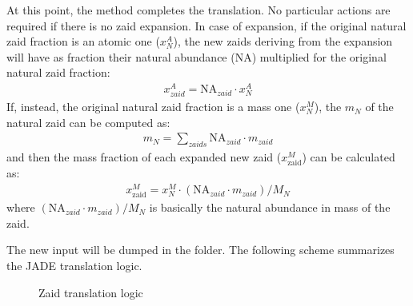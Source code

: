 \documentclass[letterpaper,10pt,english]{sphinxmanual}
\let\sphinxpxdimen\pdfpxdimen\else\newdimen\sphinxpxdimen
\begin{document}
\sphinxAtStartPar
At this point, the  method completes the translation. No particular actions
are required if there is no zaid expansion.
In case of expansion, if the original natural zaid fraction is an atomic one
(\(x^A_N\)), the new zaids deriving from the expansion will have as fraction their
natural abundance (NA) multiplied for the original natural zaid fraction:
\begin{equation*}
\begin{split}x^A_{zaid} = \text{NA}_{zaid}\cdot x^A_N\end{split}
\end{equation*}
\sphinxAtStartPar
If, instead, the original natural zaid fraction is a mass one (\(x^M_N\)),
the  \(m_N\) of the natural zaid can be computed as:
\begin{equation*}
\begin{split}m_N = \sum_{zaids} \text{NA}_{zaid}\cdot m_{zaid}\end{split}
\end{equation*}
\sphinxAtStartPar
and then the mass fraction of each expanded new zaid (\(x^M_\text{zaid}\))
can be calculated as:
\begin{equation*}
\begin{split}x^M_\text{zaid}=x^M_N\cdot (\text{NA}_{zaid}\cdot m_{zaid})/M_N\end{split}
\end{equation*}
\sphinxAtStartPar
where \((\text{NA}_{zaid}\cdot m_{zaid})/M_N\)
is basically the natural abundance in mass of the zaid.

\sphinxAtStartPar
The new input will be dumped in the
 folder.
The following scheme summarizes the JADE translation logic.

\begin{figure}[htbp]
\centering
\capstart

\noindent\sphinxincludegraphics[width=600\sphinxpxdimen]{{Translation_logic}.jpg}
\caption{Zaid translation logic}\label{\detokenize{usage/utilities:id2}}\end{figure}
\end{document}
